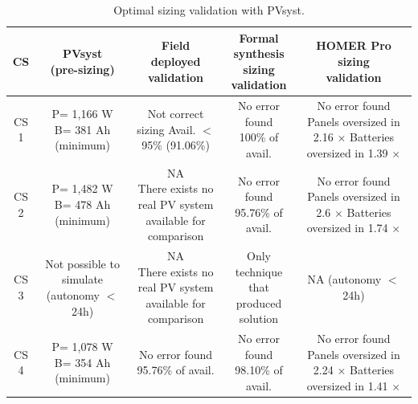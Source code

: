 \documentclass[journal]{IEEEtran}
\begin{document}
\begin{table}
\centering
\caption{Optimal sizing validation with PVsyst.}
\label{tab2}
\begin{scriptsize}
\begin{tabular}{c|c|c|c|c}
\hline
\hline
CS & \makecell{PVsyst\\(pre-sizing)}& \makecell{Field\\deployed\\validation}& \makecell{Formal synthesis\\sizing\\validation}& \makecell{HOMER Pro\\sizing\\validation}\\
\hline
\hline
CS 1 & \makecell{P= 1,166 W\\B= 381 Ah\\(minimum)} & \makecell{Not correct sizing \\Avail. $<$ 95\%\\(91.06\%)} & \makecell{No error found \\100\% of avail.} & \makecell{No error found\\Panels oversized in 2.16 $\times$\\Batteries oversized in 1.39 $\times$}\\
\hline
CS 2 & \makecell{P= 1,482 W\\B= 478 Ah\\(minimum)} & \makecell{NA\\There exists no real PV system\\available for comparison} & \makecell{No error found \\95.76\% of avail.} & \makecell{No error found\\Panels oversized in 2.6 $\times$\\Batteries oversized in 1.74 $\times$}\\
\hline
CS 3 & \makecell{Not possible to \\simulate\\(autonomy $<$ 24h)} & \makecell{NA\\There exists no real PV system\\available for comparison} & \makecell{Only technique that\\produced solution} & \makecell{NA\\(autonomy $<$ 24h)}\\
\hline
CS 4 & \makecell{P= 1,078 W\\B= 354 Ah\\(minimum)} & \makecell{No error found \\95.76\% of avail.} & \makecell{No error found \\98.10\% of avail.} & \makecell{No error found\\Panels oversized in 2.24 $\times$\\Batteries oversized in 1.41 $\times$}\\

\end{tabular}
\end{scriptsize}
\end{table}
\end{document}
